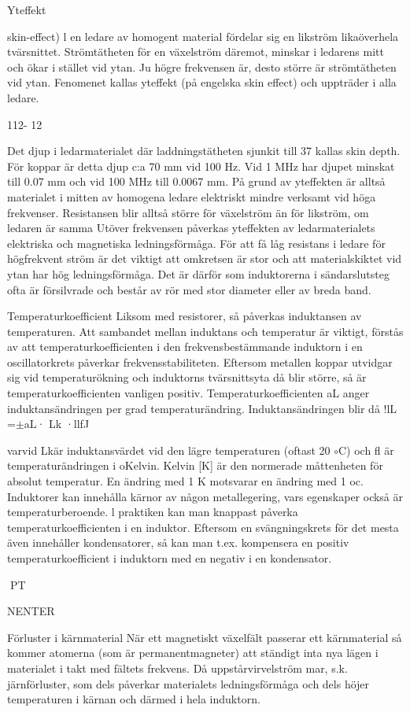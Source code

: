 Yteffekt {skin-effect)
l en ledare av homogent material fördelar sig
en likström likaöverhela tvärsnittet. Strömtätheten för en växelström däremot, minskar i
ledarens mitt och ökar i stället vid ytan. Ju
högre frekvensen är, desto större är strömtätheten vid ytan. Fenomenet kallas yteffekt
(på engelska skin effect) och uppträder i alla
ledare.

112- 12

Det djup i ledarmaterialet där laddningstätheten sjunkit till 37%
kallas skin depth. För koppar är detta djup
c:a 70 mm vid 100 Hz. Vid 1 MHz har djupet
minskat till 0.07 mm och vid 100 MHz till
0.0067 mm. På grund av yteffekten är alltså
materialet i mitten av homogena ledare elektriskt mindre verksamt vid höga frekvenser.
Resistansen blir alltså större för växelström
än för likström, om ledaren är samma
Utöver frekvensen påverkas yteffekten
av ledarmaterialets elektriska och magnetiska ledningsförmåga. För att få låg resistans
i ledare för högfrekvent ström är det viktigt att
omkretsen är stor och att materialskiktet vid
ytan har hög ledningsförmåga. Det är därför
som induktorerna i sändarslutsteg ofta är
försilvrade och består av rör med stor diameter eller av breda band.

Temperaturkoefficient
Liksom med resistorer, så påverkas induktansen av temperaturen. Att sambandet
mellan induktans och temperatur är viktigt,
förstås av att temperaturkoefficienten i den
frekvensbestämmande induktorn i en oscillatorkrets påverkar frekvensstabiliteten.
Eftersom metallen koppar utvidgar sig
vid temperaturökning och induktorns tvärsnittsyta då blir större, så är temperaturkoefficienten vanligen positiv.
Temperaturkoefficienten aL anger induktansändringen per grad temperaturändring.
Induktansändringen blir då
!lL =$\pm$aL· Lk ·llfJ

varvid Lkär induktansvärdet vid den lägre
temperaturen (oftast 20 $\circ$C) och fl{} är
temperaturändringen i oKelvin.
Kelvin [K] är den normerade måttenheten
för absolut temperatur. En ändring med 1 K
motsvarar en ändring med 1 oc.
Induktorer kan innehålla kärnor av någon
metallegering, vars egenskaper också är
temperaturberoende.
l praktiken kan man knappast påverka
temperaturkoefficienten i en induktor. Eftersom en svängningskrets för det mesta även
innehåller kondensatorer, så kan man t.ex.
kompensera en positiv temperaturkoefficient
i induktorn med en negativ i en kondensator.

PT

NENTER

Förluster i kärnmaterial
När ett magnetiskt växelfält passerar ett
kärnmaterial så kommer atomerna (som är
permanentmagneter) att ständigt inta nya
lägen i materialet i takt med fältets frekvens.
Då uppstårvirvelström mar, s.k. järnförluster,
som dels påverkar materialets ledningsförmåga och dels höjer temperaturen i kärnan och därmed i hela induktorn.

}
